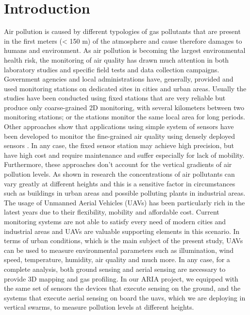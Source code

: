 \chapter{Introduction}
Air pollution is caused by different typologies of gas pollutants that are present in the first meters (< 150 m) of the atmosphere and cause therefore damages to humans and environment. As air pollution is becoming the largest environmental health risk, the monitoring of air quality has drawn much attention in both laboratory studies and specific field tests and data collection campaigns. Government agencies and local administrations have, generally, provided and used monitoring stations on dedicated sites in cities and urban areas. Usually the studies have been conducted using fixed stations that are very reliable but produce only coarse-grained 2D monitoring, with several kilometers between two monitoring stations; or the stations monitor the same local area for long periods.
Other approaches show that applications using simple system of sensors have been developed to monitor the fine-grained air quality using densely deployed sensors \cite{8718193}\cite{8682518}. In any case, the fixed sensor station may achieve high precision, but have high cost and require maintenance and suffer especially for lack of mobility.
Furthermore, these approaches don't account for the vertical gradients of air pollution levels. As shown in research \cite{8682518}\cite{8718193} the concentrations of air pollutants can vary greatly at different heights and this is a sensitive factor in circumstances such as buildings in urban areas and possible polluting plants in industrial areas.
The usage of Unmanned Aerial Vehicles (UAVs) has been particularly rich in the latest years due to their flexibility, mobility and affordable cost. Current monitoring systems are not able to satisfy every need of modern cities and industrial areas and UAVs are valuable supporting elements in this scenario.
In terms of urban conditions, which is the main subject of the present study, UAVs can be used to measure environmental parameters such as illumination, wind speed, temperature, humidity, air quality and much more. In any case, for a complete analysis, both ground sensing and aerial sensing are necessary to provide 3D mapping and gas profiling. In our ARIA project, we equipped with the same set of sensors the devices that execute sensing on the ground, and the systems that execute aerial sensing on board the \gls{uavs}, which we are deploying in vertical swarms, to measure pollution levels at different heights.

